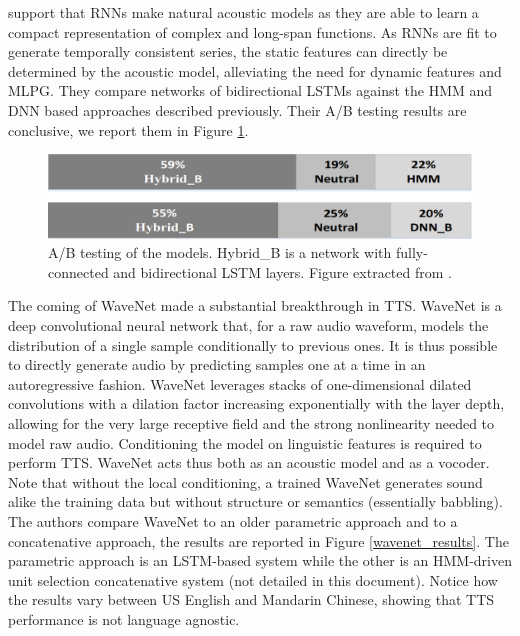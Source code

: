 \documentclass[a4paper, oneside, 12pt, english]{article}
\begin{document}
\citep{BDLSTMTTS} support that RNNs make natural acoustic models as they are able to learn a compact representation of complex and long-span functions. As RNNs are fit to generate temporally consistent series, the static features can directly be determined by the acoustic model, alleviating the need for dynamic features and MLPG. They compare networks of bidirectional LSTMs against the HMM and DNN based approaches described previously. Their A/B testing results are conclusive, we report them in Figure \ref{dblstm_subjective}.

\begin{figure}[h]
	\centering
	\includegraphics[width=0.6\linewidth]{images/bdlstm_subjective.png}
	\caption{A/B testing of the models. Hybrid\_B is a network with fully-connected and bidirectional LSTM layers. Figure extracted from \citep{BDLSTMTTS}.}
	\label{dblstm_subjective}
\end{figure}

The coming of WaveNet \citep{WaveNet} made a substantial breakthrough in TTS. WaveNet is a deep convolutional neural network that, for a raw audio waveform, models the distribution of a single sample conditionally to previous ones. It is thus possible to directly generate audio by predicting samples one at a time in an autoregressive fashion. WaveNet leverages stacks of one-dimensional dilated convolutions with a dilation factor increasing exponentially with the layer depth, allowing for the very large receptive field and the strong nonlinearity needed to model raw audio. Conditioning the model on linguistic features is required to perform TTS. WaveNet acts thus both as an acoustic model and as a vocoder. Note that without the local conditioning, a trained WaveNet generates sound alike the training data but without structure or semantics (essentially babbling). 
The authors compare WaveNet to an older parametric approach and to a concatenative approach, the results are reported in Figure \ref{wavenet_results}. The parametric approach is an LSTM-based system while the other is an HMM-driven unit selection concatenative system (not detailed in this document). Notice how the results vary between US English and Mandarin Chinese, showing that TTS performance is not language agnostic.
\end{document}

